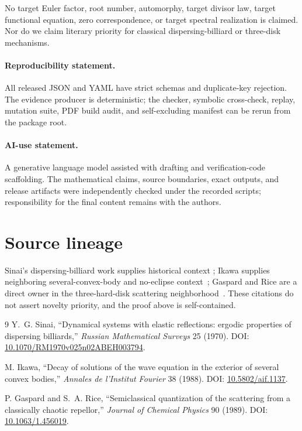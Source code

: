\documentclass[10pt]{article}
\begin{document}
No target Euler factor, root number, automorphy, target divisor law, target
functional equation, zero correspondence, or target spectral realization is
claimed.  Nor do we claim literary priority for classical dispersing-billiard
or three-disk mechanisms.

\paragraph{Reproducibility statement.}
All released JSON and YAML have strict schemas and duplicate-key rejection.
The evidence producer is deterministic; the checker, symbolic cross-check,
replay, mutation suite, PDF build audit, and self-excluding manifest can be
rerun from the package root.

\paragraph{AI-use statement.}
A generative language model assisted with drafting and verification-code
scaffolding.  The mathematical claims, source boundaries, exact outputs, and
release artifacts were independently checked under the recorded scripts;
responsibility for the final content remains with the authors.
\fi

\section*{Source lineage}
Sinai's dispersing-billiard work supplies historical context
\cite{Sinai1970}; Ikawa supplies neighboring several-convex-body and
no-eclipse context~\cite{Ikawa1988}; Gaspard and Rice are a direct owner in
the three-hard-disk scattering neighborhood~\cite{GR1989}.  These citations
do not assert novelty priority, and the proof above is self-contained.

\begin{thebibliography}{9}
Y.~G. Sinai, ``Dynamical systems with elastic reflections: ergodic
properties of dispersing billiards,'' \emph{Russian Mathematical Surveys}
25 (1970). DOI: \href{https://doi.org/10.1070/RM1970v025n02ABEH003794}
{10.1070/RM1970v025n02ABEH003794}.

M. Ikawa, ``Decay of solutions of the wave equation in the exterior of
several convex bodies,'' \emph{Annales de l'Institut Fourier} 38 (1988).
DOI: \href{https://doi.org/10.5802/aif.1137}{10.5802/aif.1137}.

P. Gaspard and S.~A. Rice, ``Semiclassical quantization of the scattering
from a classically chaotic repellor,'' \emph{Journal of Chemical Physics}
90 (1989). DOI: \href{https://doi.org/10.1063/1.456019}
{10.1063/1.456019}.
\end{thebibliography}
\end{document}
